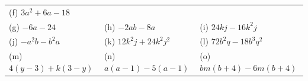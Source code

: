 \begin{enumerate}[noitemsep, label=\textbf{\arabic*}. ]
{\begin{tabular}[t]{|l|l|l|}
        (f) $3{a}^{2}+6a-18$%
     \tabularnewline\cline{1-1}\cline{2-2}\cline{3-3}
        (g) $-6a-24$ &
        (h) $-2ab-8a$ &
        (i) $24kj-16{k}^{2}j$%
     \tabularnewline\cline{1-1}\cline{2-2}\cline{3-3}
        (j) $-{a}^{2}b-{b}^{2}a$ &
        (k) $12{k}^{2}j+24{k}^{2}{j}^{2}$ &
        (l) $72{b}^{2}q-18{b}^{3}{q}^{2}$%
     \tabularnewline\cline{1-1}\cline{2-2}\cline{3-3}
        (m) $4\left(y-3\right)+k\left(3-y\right)$ &
        (n) $a\left(a-1\right)-5\left(a-1\right)$ &
        (o) $bm\left(b+4\right)-6m\left(b+4\right)$%

\end{tabular}}
\end{enumerate}
